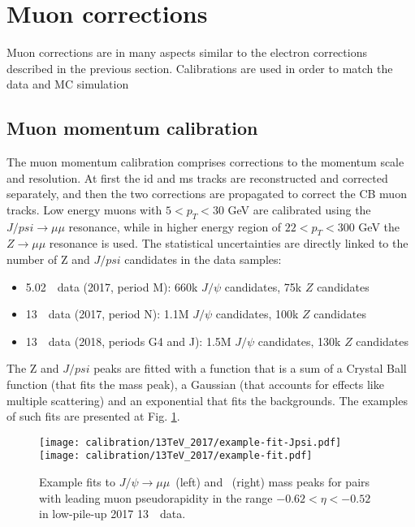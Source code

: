     \section{Muon corrections}
	Muon corrections are in many aspects similar to the electron corrections described in the previous section. Calibrations are used in order to match the data and MC simulation 
    \subsection{Muon momentum calibration}
	The muon momentum calibration comprises corrections to the momentum scale and resolution. At first the \gls{id} and \gls{ms} tracks are reconstructed and corrected separately, and then the two corrections are propagated to correct the CB muon tracks. Low energy muons with $5<p_T<30$ GeV are calibrated using the $J/psi\rightarrow\mu\mu$ resonance, while in higher energy region of $22<p_T<300$ GeV the $Z \rightarrow\mu\mu$ resonance is used. The statistical uncertainties are directly linked to the number of Z and $J/psi$ candidates in the data samples:
	\begin{itemize}
			\item{5.02~\TeV\ data (2017, period M): 660k $J/\psi$ candidates, 75k $Z$ candidates}
			\item{13~\TeV\ data (2017, period N): 1.1M $J/\psi$ candidates, 100k $Z$ candidates}
			\item{13~\TeV\ data (2018, periods G4 and J): 1.5M $J/\psi$ candidates, 130k $Z$ candidates}
	\end{itemize}
	The Z and $J/psi$ peaks are fitted with a function that is a sum of a Crystal Ball function (that fits the mass peak), a Gaussian (that accounts for effects like multiple scattering) and an exponential that fits the backgrounds. The examples of such fits are presented at Fig. \ref{fig:calib-fits}.
	
	\begin{figure}[htb!]
		\begin{center}
			\texttt{[image: calibration/13TeV\_2017/example-fit-Jpsi.pdf]}
			\texttt{[image: calibration/13TeV\_2017/example-fit.pdf]}
			\caption{Example fits to $J/\psi \to \mu\mu$~(left) and \Zmm~(right) mass peaks for pairs with leading muon pseudorapidity in the range $-0.62<\eta<-0.52$ in low-pile-up 2017 13~\TeV\ data.}
			\label{fig:calib-fits}
		\end{center}
	\end{figure}

